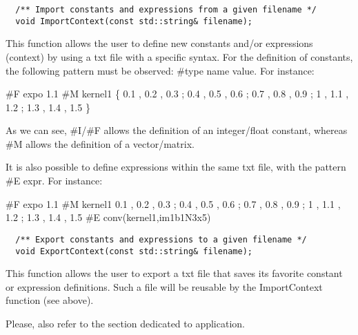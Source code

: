 \begin{verbatim}
  /** Import constants and expressions from a given filename */
  void ImportContext(const std::string& filename);
\end{verbatim}

This function allows the user to define new constants and/or expressions (context) by using a txt file with a specific syntax.
For the definition of constants, the following pattern must be observed:
\newline  \#type name value. 
\newline For instance:


\#F expo 1.1 \newline 
\#M kernel1 \{ 0.1 , 0.2 , 0.3 ; 0.4 , 0.5 , 0.6 ; 0.7 , 0.8 , 0.9 ; 1 , 1.1 , 1.2 ; 1.3 , 1.4 , 1.5 \} \newline


As we can see,  \#I/\#F allows the definition of an integer/float constant, whereas \#M allows the definition of a vector/matrix. 

It is also possible to define expressions within the same txt file, with the pattern \#E expr. For instance:


\#F expo 1.1 \newline 
\#M kernel1 { 0.1 , 0.2 , 0.3 ; 0.4 , 0.5 , 0.6 ; 0.7 , 0.8 , 0.9 ; 1 , 1.1 , 1.2 ; 1.3 , 1.4 , 1.5 } \newline 
\#E conv(kernel1,im1b1N3x5) \newline

\begin{verbatim}
  /** Export constants and expressions to a given filename */
  void ExportContext(const std::string& filename);
\end{verbatim}

This function allows the user to export a txt file that saves its favorite constant or expression definitions. Such a file will be reusable by the ImportContext function (see above).


\newline 
\newline 
Please, also refer to the section dedicated to  application.



